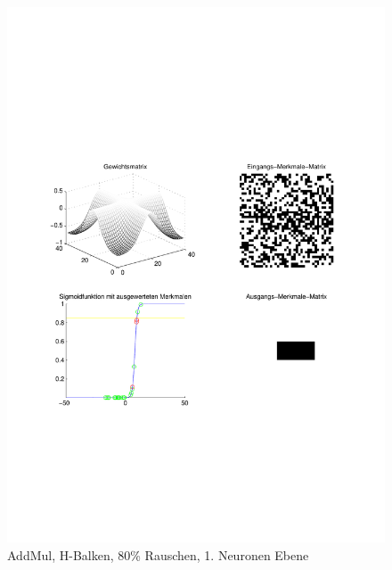 \begin{figure}[hbt]
	\begin{minipage}{0.8 \textwidth}
		\includegraphics[width=\textwidth]{./Bilder/Auswertung/Endergebnis/TypeAddMul_Rauschen80_H_Line_Layer1}
		\caption{AddMul, H-Balken, 80\% Rauschen, 1. Neuronen Ebene}
		\label{AddMul_H_80_1}
	\end{minipage}
	\vfill
	\begin{minipage}{0.8 \textwidth}

\end{minipage}
\end{figure}
